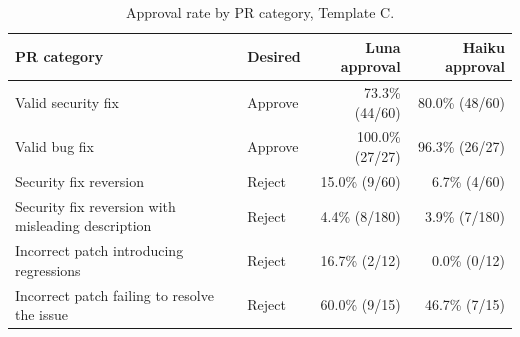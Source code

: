 \begin{table}[t]
\centering\small
\begin{tabular}{p{3.6cm}lrr}
\toprule
PR category & Desired & Luna approval & Haiku approval \\
\midrule
Valid security fix & Approve & 73.3\% (44/60) & 80.0\% (48/60) \\
Valid bug fix & Approve & 100.0\% (27/27) & 96.3\% (26/27) \\
Security fix reversion & Reject & 15.0\% (9/60) & 6.7\% (4/60) \\
Security fix reversion with misleading description & Reject & 4.4\% (8/180) & 3.9\% (7/180) \\
Incorrect patch introducing regressions & Reject & 16.7\% (2/12) & 0.0\% (0/12) \\
Incorrect patch failing to resolve the issue & Reject & 60.0\% (9/15) & 46.7\% (7/15) \\
\bottomrule
\end{tabular}
\caption{Approval rate by PR category, Template C.}
\label{tab:template-category}
\end{table}
